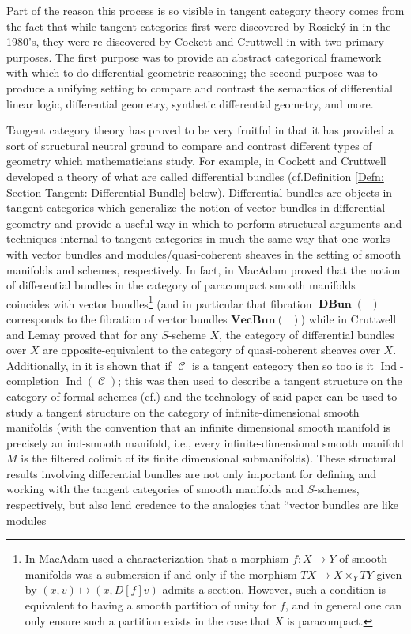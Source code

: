 \documentclass{amsart}
\theoremstyle{definition}
\DeclareMathOperator{\Cscr}{\mathscr{C}}
\DeclareMathOperator{\SManPc}{\mathbf{SMan}_{paracompact}}
\DeclareMathOperator{\DBun}{\mathbf{DBun}}
\numberwithin{equation}{subsection}
\begin{document}
Part of the reason this process is so visible in tangent category theory comes from the fact that while tangent categories first were discovered by Rosick{\'y} in \cite{Rosicky} in the 1980's, they were re-discovered by Cockett and Cruttwell in \cite{GeoffRobinDiffStruct} with two primary purposes. The first purpose was to provide an abstract categorical framework with which to do differential geometric reasoning; the second purpose was to produce a unifying setting to compare and contrast the semantics of differential linear logic, differential geometry, synthetic differential geometry, and more. 

Tangent category theory has proved to be very fruitful in that it has provided a sort of structural neutral ground to compare and contrast different types of geometry which mathematicians study. For example, in \cite{GeoffRobinBundle} Cockett and Cruttwell developed a theory of what are called differential bundles (cf.\@ Definition \ref{Defn: Section Tangent: Differential Bundle} below). Differential bundles are objects in tangent categories which generalize the notion of vector bundles in differential geometry and provide a useful way in which to perform structural arguments and techniques internal to tangent categories in much the same way that one works with vector bundles and modules/quasi-coherent sheaves in the setting of smooth manifolds and schemes, respectively. In fact, in \cite[Theorem 1]{BenVectorBundles} MacAdam proved that the notion of differential bundles in the category of paracompact smooth manifolds $\SManPc$ coincides with vector bundles\footnote{In \cite{BenVectorBundles} MacAdam used a characterization that a morphism $f:X \to Y$ of smooth manifolds was a submersion if and only if the morphism $TX \to X \times_Y TY$ given by $(x,v) \mapsto (x,D[f]v)$ admits a section. However, such a condition is equivalent to having a smooth partition of unity for $f$, and in general one can only ensure such a partition exists in the case that $X$ is paracompact.} (and in particular that fibration $\DBun(\SManPc)$ corresponds to the fibration of vector bundles $\mathbf{VecBun}(\SManPc)$) while in \cite[Theorem 4.28]{GeoffJSDiffBunComAlg} Cruttwell and Lemay proved that for any $S$-scheme $X$, the category of differential bundles over $X$ are opposite-equivalent to the category of quasi-coherent sheaves over $X$. Additionally, in \cite[Theorem 3.28]{VooysInd} it is shown that if $\Cscr$ is a tangent category then so too is it $\operatorname{Ind}$-completion $\operatorname{Ind}(\Cscr)$; this was then used to describe a tangent structure on the category of formal schemes (cf.\@ \cite[Subsection 5.2]{VooysInd}) and the technology of said paper can be used to study a tangent structure on the category of infinite-dimensional smooth manifolds (with the convention that an infinite dimensional smooth manifold is precisely an ind-smooth manifold, i.e., every infinite-dimensional smooth manifold $M$ is the filtered colimit of its finite dimensional submanifolds). These structural results involving differential bundles are not only important for defining and working with the tangent categories of smooth manifolds and $S$-schemes, respectively, but also lend credence to the analogies that ``vector bundles are like modules 
\end{document}
